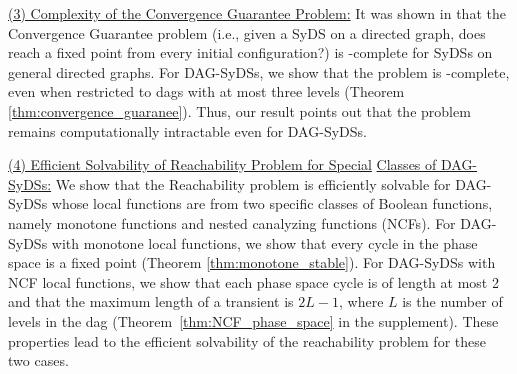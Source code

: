 \smallskip

\noindent
\underline{(3) Complexity of the Convergence Guarantee Problem:}
It was shown in \cite{Chistikov-etal-2020} that
the Convergence Guarantee problem 
(i.e., given a SyDS \cals{} on
a directed graph, does \cals{} reach a fixed point from every
initial configuration?)  
is \cpsp-complete for SyDSs on general directed graphs.
For DAG-SyDSs, we show that the problem is \cconp-complete,
even when restricted to dags with at most  three levels 
(Theorem \ref{thm:convergence_guaranee}).
Thus, our result points out that the problem remains 
computationally intractable even for DAG-SyDSs.

\smallskip

\noindent
\underline{(4) Efficient Solvability of Reachability Problem for Special}\newline
\underline{Classes of DAG-SyDSs:} 
We show that the Reachability problem is efficiently solvable for
DAG-SyDSs whose local functions are from two specific
classes of Boolean functions, namely monotone functions and
nested canalyzing functions (NCFs).
For DAG-SyDSs with monotone local functions, we show that every cycle in the
phase space is a fixed point (Theorem \ref{thm:monotone_stable}).
For DAG-SyDSs with NCF local functions, we show that each phase 
space cycle is of length at most 2
and that the maximum length of a transient is $2L-1$, where $L$
is the number of levels in the dag
(Theorem~\ref{thm:NCF_phase_space} in the supplement).
These properties lead to
the efficient solvability of the reachability
problem for these two cases.

\iffalse
The results in \cite{Rosenkrantz-etal-2018} readily imply
that the Reachability problem for SyDSs whose local
functions are NCFs and whose directed graphs may contain cycles  
is \cpsp-complete.
To our knowledge, the only previous result on the efficient
solvability of the  Reachability problem for DAG-SyDSs is
for the case when each local function is a bithreshold
function \cite{KKM+2013}.

 we show
that the length of every phase space cycle is at most 2.
Moreover, if the number of levels of  \cals{} is $L$,
no transient is longer than $2L-1$
(Theorem \ref{thm:NCF_phase_space}).
These properties
directly imply the efficient solvability of the reachability
problem for such DAG-SyDSs.
\fi



